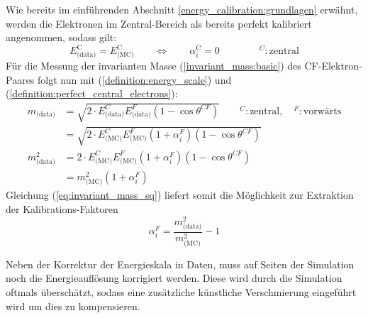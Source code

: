 Wie bereits im einführenden Abschnitt \ref{energy_calibration:grundlagen}
erwähnt, werden die Elektronen im Zentral-Bereich als bereits perfekt
kalibriert angenommen, sodass gilt:
\begin{equation}
    \label{definition:perfect_central_electrons}
    E_\text{(data)}^\text{C} = E_\text{(MC)}^\text{C}
    \qquad \Longleftrightarrow \qquad
    \alpha_i^\text{C} = 0
    \qquad\qquad
    ^C : \text{zentral}
\end{equation}
Für die Messung der invarianten Masse (\ref{invariant_mass:basic}) des
\acs{CF}-Elektron-Paares folgt nun mit (\ref{definition:energy_scale}) und
(\ref{definition:perfect_central_electrons}):
\begin{align}
    m_\text{(data)}   &= \sqrt{ 2 \cdot E^C_\text{(data)} E^F_{\text{(data)}}
                         (1-\cos\theta^{CF})} 
                         \qquad ^C: \text{zentral}, \quad ^F: \text{vorwärts}
                         \nonumber \\[5pt]
                      &= \sqrt{ 2 \cdot E^C_\text{(MC)} E^F_{\text{(MC)}}
                         (1+\alpha^F_i)(1-\cos\theta^{CF})}
                         \nonumber \\[15pt]
    m^2_\text{(data)} &= 2 \cdot E^C_\text{(MC)} E^F_{\text{(MC)}}
                         (1+\alpha^F_i)(1-\cos\theta^{CF})
                         \nonumber \\[5pt]
                      &= m^2_\text{(MC)} (1+\alpha^F_i)
                         \label{eq:invariant_mass_sq}
\end{align}
Gleichung (\ref{eq:invariant_mass_sq}) liefert somit die Möglichkeit zur
Extraktion der Kalibrations-Faktoren
\begin{equation}
    \label{eq:extraction_alpha}
    \alpha_i^F = \frac{m^2_\text{(data)}}{m^2_\text{(MC)}} - 1
\end{equation}

Neben der Korrektur der Energieskala in Daten, muss auf Seiten der
Simulation noch die Energieauflösung korrigiert werden. Diese wird durch die
Simulation oftmals überschätzt, sodass eine zusätzliche
künstliche Verschmierung eingeführt wird um dies zu kompensieren.

